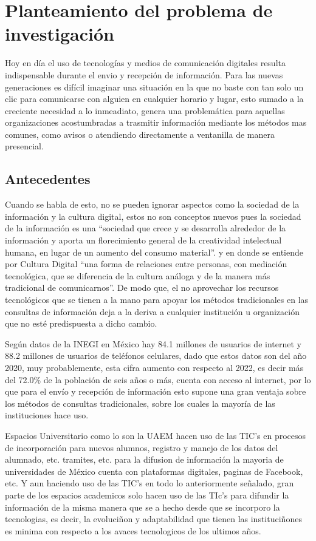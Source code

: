 \chapter{Planteamiento del problema de investigación}

Hoy en día el uso de tecnologías y medios de comunicación digitales resulta indispensable durante el envio y recepción de información. Para las nuevas generaciones es difícil imaginar una situación en la que no baste con tan solo un clic para comunicarse con alguien en cualquier horario y lugar, esto sumado a la creciente necesidad a lo inmeadiato, genera una problemática para aquellas organizaciones acostumbradas a trasmitir información mediante los métodos mas comunes, como avisos o atendiendo directamente a ventanilla de manera presencial. 

\section{Antecedentes}

Cuando se habla de esto, no se pueden ignorar aspectos como la sociedad de la información y la cultura digital, estos no son conceptos nuevos pues la sociedad de la información es una “sociedad que crece y se desarrolla alrededor de la información y aporta un florecimiento general de la creatividad intelectual humana, en lugar de un aumento del consumo material”\citep[págs. 124]{bib1}. y en donde se entiende por Cultura Digital “una forma de relaciones entre personas, con mediación tecnológica, que se diferencia de la cultura análoga y de la manera más tradicional de comunicarnos”\citep{art1}.
De modo que, el no aprovechar los recursos tecnológicos que se tienen a la mano para apoyar los métodos tradicionales en las consultas de información deja a la deriva a cualquier institución u organización que no esté predispuesta a dicho cambio.

Según datos de la INEGI en México hay 84.1 millones de usuarios de internet y 88.2 millones de usuarios de teléfonos celulares\citep{inegi2021}, dado que estos datos son del año 2020, muy probablemente, esta cifra aumento con respecto al 2022, es decir más del 72.0\% de la población de seis años o más, cuenta con acceso al internet, por lo que para el envío y recepción de información esto supone una gran ventaja sobre los métodos de consultas tradicionales, sobre los cuales la mayoría de las instituciones hace uso.

Espacios Universitario como lo son la UAEM hacen uso de las TIC's en procesos de incorporación para nuevos alumnos, registro y manejo de los datos del alumnado, etc. tramites, etc. para la difusion de información la mayoria de universidades de México cuenta con plataformas digitales, paginas de Facebook, etc. Y aun haciendo uso de las TIC's en todo lo anteriormente señalado, gran parte de los espacios academicos solo hacen uso de las TIc's para difundir la información de la misma manera que se a hecho desde que se incorporo la tecnologias, es decir, la evoluciñon y adaptabilidad que tienen las instituciñones es minima con respecto a los avaces tecnologicos de los ultimos años.

